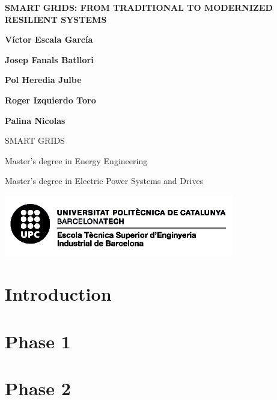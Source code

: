 \documentclass[10pt, a4paper]{report}
\begin{document}
\begin{titlepage}
   \begin{center}
      \vspace*{2em}
      {\Large \bfseries SMART GRIDS: FROM TRADITIONAL TO MODERNIZED RESILIENT SYSTEMS}

       \vspace{6em}

       \textbf{Víctor Escala García}

       \textbf{Josep Fanals Batllori}

       \textbf{Pol Heredia Julbe}

       \textbf{Roger Izquierdo Toro}

       \textbf{Palina Nicolas}

       \vfill

       \vspace{1em}

       SMART GRIDS

       Master's degree in Energy Engineering

       Master's degree in Electric Power Systems and Drives

       \vspace{8em}
     
       \includegraphics[width=10cm]{Data/Logo.png}
            
   \end{center}
\end{titlepage}



\tableofcontents{}


\chapter{Introduction}


\chapter{Phase 1}


\chapter{Phase 2}

\end{document}
